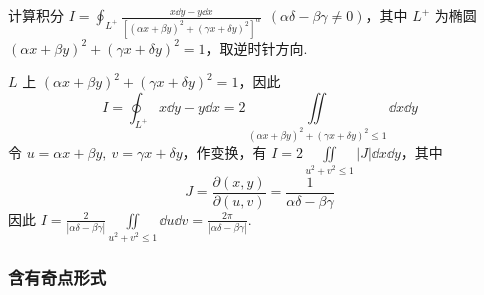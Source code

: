 \begin{example}
    计算积分 $\displaystyle I=\oint_{L^+}\frac{x\dd y-y\dd x}{[(\alpha x+\beta y)^2+(\gamma x+\delta y)^2]^\alpha}~~(\alpha\delta-\beta\gamma\not=0)$，其中 $L^+$ 为椭圆 $(\alpha x+\beta y)^2+(\gamma x+\delta y)^2=1$，取逆时针方向.
\end{example}
\begin{solution}
    $L$ 上 $(\alpha x+\beta y)^2+(\gamma x+\delta y)^2=1$，因此
    $$\displaystyle I=\oint_{L^+}x\dd y-y\dd x=2\iint\limits_{(\alpha x+\beta y)^2+(\gamma x+\delta y)^2\leqslant  1}\dd x\dd y$$
    令 $u=\alpha x+\beta y,~v=\gamma x+\delta y$，作变换，有 $\displaystyle I=2\iint\limits_{u^2+v^2\leqslant  1}|J|\dd x\dd y$，其中
    $$J=\frac{\partial (x,y)}{\partial (u,v)}=\frac{1}{\alpha\delta-\beta\gamma}$$
    因此 $\displaystyle I=\frac{2}{|\alpha\delta-\beta\gamma|}\iint\limits_{u^2+v^2\leqslant  1}\dd u\dd v=\frac{2\pi}{|\alpha\delta-\beta\gamma|}.$
\end{solution}

\subsubsection{含有奇点形式}

